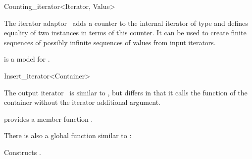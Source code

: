 \begin{ccRefClass}{Counting_iterator<Iterator, Value>}
  \label{sectionCountingIterator}

  
  \ccDefinition The iterator adaptor \ccClassTemplateName\ adds a
  counter to the internal iterator of type  and defines
  equality of two instances in terms of this counter. It can be used
  to create finite sequences of possibly infinite sequences of values
  from input iterators.


  \ccIsModel
  
  \ccRequirements {} is a model for
  .

  \ccCreation

  
  

  \ccSeeAlso

\end{ccRefClass}

\begin{ccRefClass}{Insert_iterator<Container>}
  \label{sectionInsertIterator}

  
  \ccDefinition The output iterator \ccClassTemplateName\ is similar
  to , but differs in that it calls the
   function of the container without the iterator
  additional argument.


  \ccIsModel
  
  \ccRequirements {} provides a member function
  .

  \ccCreation

  

  There is also a global function similar to :

  { Constructs . }
  
\end{ccRefClass}

